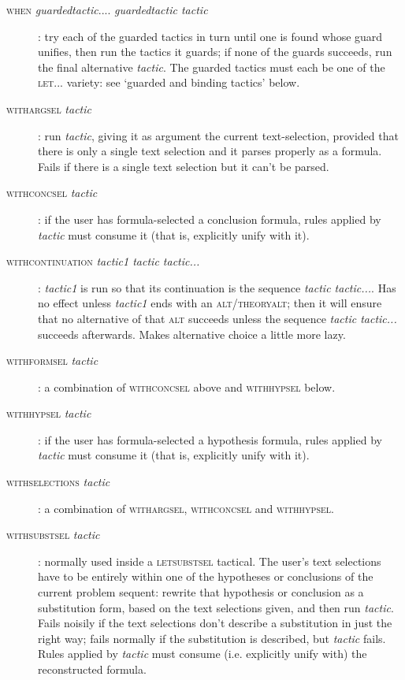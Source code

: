 \begin{description}
\item [\textsc{when} \textit{guardedtactic}.... \textit{guardedtactic tactic}]: try each of the guarded tactics in turn until one is found whose guard unifies, then run the tactics it guards; if none of the guards succeeds, run the final alternative \textit{tactic}. The guarded tactics must each be one of the \textsc{let...} variety: see `guarded and binding tactics' below.


\item [\textsc{withargsel} \textit{tactic}]: run \textit{tactic}, giving it as argument the current text-selection, provided that there is only a single text selection and it parses properly as a formula. Fails if there is a single text selection but it can't be parsed.


\item [\textsc{withconcsel} \textit{tactic}]: if the user has formula-selected a conclusion formula, rules applied by \textit{tactic} must consume it (that is, explicitly unify with it).


\item [\textsc{withcontinuation} \textit{tactic1 tactic tactic...}]: \textit{tactic1} is run so that its continuation is the sequence \textit{tactic tactic...}. Has no effect unless \textit{tactic1} ends with an \textsc{alt/theoryalt}; then it will ensure that no alternative of that \textsc{alt} succeeds unless the sequence \textit{tactic tactic...} succeeds afterwards. Makes alternative choice a little more lazy.


\item [\textsc{withformsel} \textit{tactic}]: a combination of \textsc{withconcsel} above and \textsc{withhypsel} below.


\item [\textsc{withhypsel} \textit{tactic}]: if the user has formula-selected a hypothesis formula, rules applied by \textit{tactic} must consume it (that is, explicitly unify with it).


\item [\textsc{withselections} \textit{tactic}]: a combination of \textsc{withargsel}, \textsc{withconcsel} and \textsc{withhypsel}.


\item [\textsc{withsubstsel} \textit{tactic}]: normally used inside a \textsc{letsubstsel} tactical. The user's text selections have to be entirely within one of the hypotheses or conclusions of the current problem sequent: rewrite that hypothesis or conclusion as a substitution form, based on the text selections given, and then run \textit{tactic}. Fails noisily if the text selections don't describe a substitution in just the right way; fails normally if the substitution is described, but \textit{tactic} fails. Rules applied by \textit{tactic} must consume (i.e. explicitly unify with) the reconstructed formula.



\end{description}
